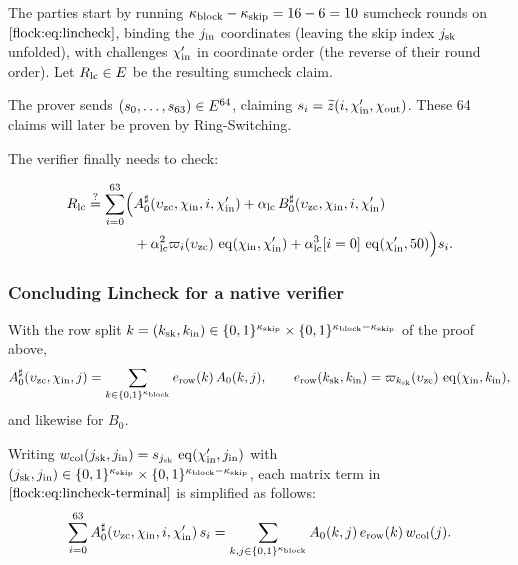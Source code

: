 \vspace{2mm}

The parties start by running $\kappa_{\mathrm{block}} - \kappa_{\mathrm{skip}} = 16 - 6 = 10$ sumcheck rounds on $\eqref{flock:eq:lincheck}$, binding the $j_{\mathrm{in}}$ coordinates (leaving the skip index $j_{\mathrm{sk}}$ unfolded), with challenges $\chi'_{\mathrm{in}}$ in coordinate order (the reverse of their round order). Let $R_{\mathrm{lc}}\in E$ be the resulting sumcheck claim.

The prover sends $(s_0,\ldots,s_{63})\in E^{64}$, claiming $s_i=\widetilde{z}(i,\chi'_{\mathrm{in}},\chi_{\mathrm{out}})$. These 64 claims will later be proven by Ring-Switching.

The verifier finally needs to check:

\begin{equation}\label{flock:eq:lincheck-terminal}
\begin{split}
R_{\mathrm{lc}}\stackrel{?}{=}\sum_{i=0}^{63}\Bigl(&A^{\sharp}_0(\upsilon_{\mathrm{zc}},\chi_{\mathrm{in}},i,\chi'_{\mathrm{in}})+\alpha_{\mathrm{lc}}\,B^{\sharp}_0(\upsilon_{\mathrm{zc}},\chi_{\mathrm{in}},i,\chi'_{\mathrm{in}})\\
&+\alpha_{\mathrm{lc}}^2\varpi_i(\upsilon_{\mathrm{zc}})\,\operatorname{eq}(\chi_{\mathrm{in}},\chi'_{\mathrm{in}})+\alpha_{\mathrm{lc}}^3[i=0]\,\operatorname{eq}(\chi'_{\mathrm{in}},50)\Bigr)s_i.
\end{split}
\end{equation}

\subsubsection{Concluding Lincheck for a native verifier}\label{flock:native}


With the row split $k=(k_{\mathrm{sk}},k_{\mathrm{in}}) \in\{0,1\}^{\kappa_{\mathrm{skip}}} \times \{0,1\}^{\kappa_{\mathrm{block}}-\kappa_{\mathrm{skip}}}$ of the proof above,
\begin{equation}\label{flock:eq:erow}
A^{\sharp}_0(\upsilon_{\mathrm{zc}},\chi_{\mathrm{in}},j)=\sum_{k\in\{0,1\}^{\kappa_{\mathrm{block}}}}e_{\mathrm{row}}(k)\,A_0(k,j),\qquad
e_{\mathrm{row}}(k_{\mathrm{sk}},k_{\mathrm{in}})=\varpi_{k_{\mathrm{sk}}}(\upsilon_{\mathrm{zc}})\,\operatorname{eq}(\chi_{\mathrm{in}},k_{\mathrm{in}}),
\end{equation}
and likewise for $B_0$.

Writing $w_{\mathrm{col}}(j_{\mathrm{sk}},j_{\mathrm{in}})=s_{j_{\mathrm{sk}}}\,\operatorname{eq}(\chi'_{\mathrm{in}},j_{\mathrm{in}})$ with $(j_{\mathrm{sk}},j_{\mathrm{in}}) \in\{0,1\}^{\kappa_{\mathrm{skip}}} \times \{0,1\}^{\kappa_{\mathrm{block}}-\kappa_{\mathrm{skip}}}$, each matrix term in $\eqref{flock:eq:lincheck-terminal}$ is simplified as follows:
\begin{equation}\label{flock:eq:matrix-form}
\sum_{i=0}^{63}A^{\sharp}_0(\upsilon_{\mathrm{zc}},\chi_{\mathrm{in}},i,\chi'_{\mathrm{in}})\,s_i=\sum_{k,j\in\{0,1\}^{\kappa_{\mathrm{block}}}}A_0(k,j)\,e_{\mathrm{row}}(k)\,w_{\mathrm{col}}(j).
\end{equation}

